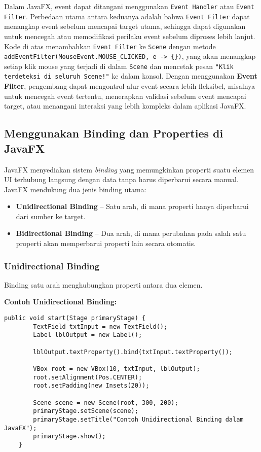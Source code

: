 Dalam JavaFX, event dapat ditangani menggunakan \texttt{Event Handler} atau \texttt{Event Filter}. Perbedaan utama antara keduanya adalah bahwa \texttt{Event Filter} dapat menangkap event sebelum mencapai target utama, sehingga dapat digunakan untuk mencegah atau memodifikasi perilaku event sebelum diproses lebih lanjut. Kode di atas menambahkan \texttt{Event Filter} ke \texttt{Scene} dengan metode \texttt{addEventFilter(MouseEvent.MOUSE\_CLICKED, e -> \{\})}, yang akan menangkap setiap klik mouse yang terjadi di dalam \texttt{Scene} dan mencetak pesan \texttt{"Klik terdeteksi di seluruh Scene!"} ke dalam konsol. Dengan menggunakan \textbf{Event Filter}, pengembang dapat mengontrol alur event secara lebih fleksibel, misalnya untuk mencegah event tertentu, menerapkan validasi sebelum event mencapai target, atau menangani interaksi yang lebih kompleks dalam aplikasi JavaFX.


\subsection{Menggunakan Binding dan Properties di JavaFX}

JavaFX menyediakan sistem \textit{binding} yang memungkinkan properti suatu elemen UI terhubung langsung dengan data tanpa harus diperbarui secara manual. JavaFX mendukung dua jenis binding utama:

\begin{itemize}
\item \textbf{Unidirectional Binding} – Satu arah, di mana properti hanya diperbarui dari sumber ke target.
\item \textbf{Bidirectional Binding} – Dua arah, di mana perubahan pada salah satu properti akan memperbarui properti lain secara otomatis.
\end{itemize}

\subsubsection{Unidirectional Binding}

Binding satu arah menghubungkan properti antara dua elemen.

\textbf{Contoh Unidirectional Binding:}
\begin{lstlisting}[style=JavaStyle, caption=Menghubungkan Label dengan TextField]
	public void start(Stage primaryStage) {
		TextField txtInput = new TextField();
		Label lblOutput = new Label();
		
		lblOutput.textProperty().bind(txtInput.textProperty());
		
		VBox root = new VBox(10, txtInput, lblOutput);
		root.setAlignment(Pos.CENTER);
		root.setPadding(new Insets(20));
		
		Scene scene = new Scene(root, 300, 200);
		primaryStage.setScene(scene);
		primaryStage.setTitle("Contoh Unidirectional Binding dalam JavaFX");
		primaryStage.show();
	}
\end{lstlisting}


